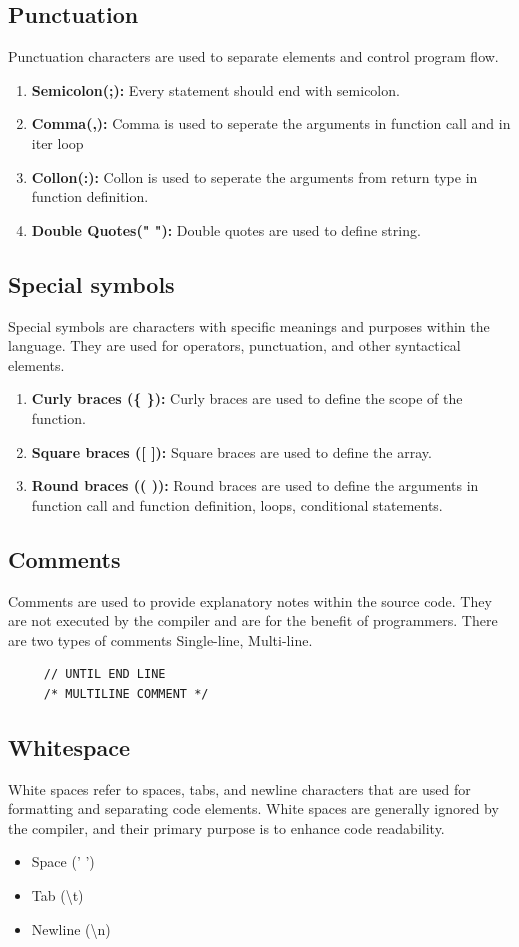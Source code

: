 \documentclass[12pt]{article}
\begin{document}
\subsection{Punctuation}
Punctuation characters are used to separate elements and control program flow. 
\begin{enumerate}
    \item \textbf{Semicolon(;):} Every statement should end with semicolon.
    \item \textbf{Comma(,):} Comma is used to seperate the arguments in function call and in iter loop
    \item \textbf{Collon(:):} Collon is used to seperate the arguments from return type in function definition.
    \item \textbf{Double Quotes(" "):} Double quotes are used to define string.
\end{enumerate}

\subsection{Special symbols}
Special symbols are characters with specific meanings and purposes within the language. They are used for operators, punctuation, and other syntactical elements.
\begin{enumerate}
    \item \textbf{Curly braces (\{ \}):} Curly braces are used to define the scope of the function.
    \item \textbf{Square braces ([ ]):} Square braces are used to define the array.
    \item \textbf{Round braces (( )):} Round braces are used to define the arguments in function call and function definition, loops, conditional statements.
\end{enumerate}

\subsection{Comments}
Comments are used to provide explanatory notes within the source code. They are not executed by the compiler and are for the benefit of programmers. There are two types of comments Single-line, Multi-line. \\

\begin{BVerbatim}
     // UNTIL END LINE 
     /* MULTILINE COMMENT */
\end{BVerbatim}

\subsection{Whitespace}
White spaces refer to spaces, tabs, and newline characters that are used for formatting and separating code elements. White spaces are generally ignored by the compiler, and their primary purpose is to enhance code readability.
\begin{itemize}
    \item Space (' ')
    \item Tab (\textbackslash{}t)
    \item Newline (\textbackslash{}n)
\end{itemize}
\end{document}
